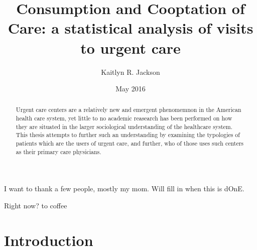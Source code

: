 \documentclass[12pt,twoside]{reedthesis}
\title{Consumption and Cooptation of Care: a statistical analysis of visits to
urgent care}
\author{Kaitlyn R. Jackson}
\date{May 2016}
\begin{document}
      \maketitle
  
  \frontmatter %
  \pagestyle{empty} %

      \begin{acknowledgements}
      I want to thank a few people, mostly my mom. Will fill in when this is
      dOnE.
    \end{acknowledgements}
  
  

      \hypersetup{linkcolor=black}
    \setcounter{tocdepth}{2}
    \tableofcontents
  
      \listoftables
  
      \listoffigures
  
      \begin{abstract}
      Urgent care centers are a relatively new and emergent phenomemnon in the
      American health care system, yet little to no academic reasearch has
      been performed on how they are situated in the larger sociological
      understanding of the healthcare system. This thesis attempts to further
      such an understanding by examining the typologies of patients which are
      the users of urgent care, and further, who of those uses such centers as
      their primary care physicians.
    \end{abstract}
  
      \begin{dedication}
      Right now? to coffee
    \end{dedication}
  
  \mainmatter %
  \pagestyle{fancyplain} %

  \chapter*{Introduction}\label{introduction}
  
  \setcounter{chapter}{1} \setcounter{section}{0} \doublespacing
  
\end{document}
